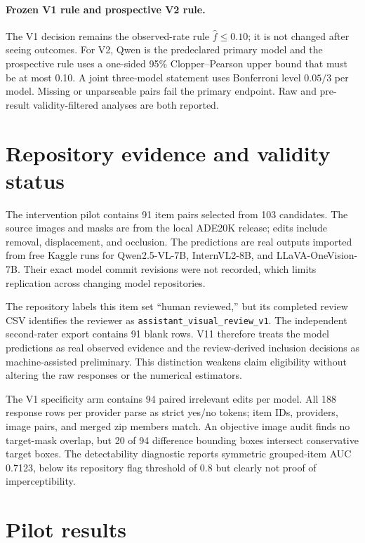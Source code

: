 \documentclass[10pt]{article}
\begin{document}
\paragraph{Frozen V1 rule and prospective V2 rule.}
The V1 decision remains the observed-rate rule $\hat f\leq0.10$; it is not changed after
seeing outcomes. For V2, Qwen is the predeclared primary model and the prospective rule
uses a one-sided 95\% Clopper--Pearson upper bound that must be at most 0.10. A joint
three-model statement uses Bonferroni level $0.05/3$ per model. Missing or unparseable
pairs fail the primary endpoint. Raw and pre-result validity-filtered analyses are both
reported.

\section{Repository evidence and validity status}

The intervention pilot contains 91 item pairs selected from 103 candidates. The source
images and masks are from the local ADE20K release; edits include removal, displacement,
and occlusion. The predictions are real outputs imported from free Kaggle runs for
Qwen2.5-VL-7B, InternVL2-8B, and LLaVA-OneVision-7B. Their exact model commit revisions
were not recorded, which limits replication across changing model repositories.

The repository labels this item set ``human reviewed,'' but its completed review CSV
identifies the reviewer as \texttt{assistant\_visual\_review\_v1}. The independent
second-rater export contains 91 blank rows. V11 therefore treats the model predictions
as real observed evidence and the review-derived inclusion decisions as
machine-assisted preliminary. This distinction weakens claim eligibility without
altering the raw responses or the numerical estimators.

The V1 specificity arm contains 94 paired irrelevant edits per model. All 188 response
rows per provider parse as strict yes/no tokens; item IDs, providers, image pairs, and
merged zip members match. An objective image audit finds no target-mask overlap, but 20
of 94 difference bounding boxes intersect conservative target boxes. The detectability
diagnostic reports symmetric grouped-item AUC 0.7123, below its repository flag threshold
of 0.8 but clearly not
proof of imperceptibility.

\section{Pilot results}
\end{document}
